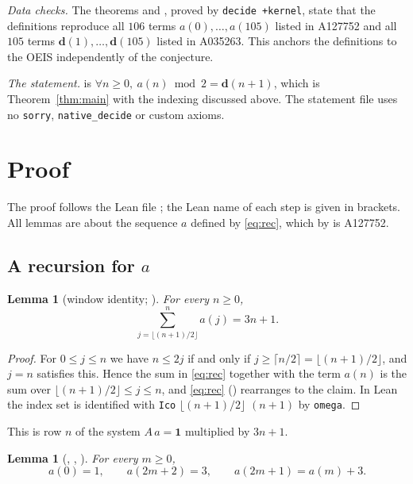 \documentclass[11pt]{amsart}
\theoremstyle{plain}
\newtheorem{lemma}[theorem]{Lemma}
\theoremstyle{definition}
\newcommand{\pd}{\mathbf{d}}
\begin{document}
\emph{Data checks.} The theorems  and , proved by \texttt{decide +kernel}, state that the definitions reproduce all $106$ terms $a(0),\dots,a(105)$ listed in A127752 and all $105$ terms $\pd(1),\dots,\pd(105)$ listed in A035263. This anchors the definitions to the OEIS independently of the conjecture.

\emph{The statement.}  is $\forall n\ge0,\ a(n)\bmod 2=\pd(n+1)$, which is Theorem~\ref{thm:main} with the indexing discussed above. The statement file uses no \texttt{sorry}, \texttt{native\_decide} or custom axioms.

\section{Proof}\label{sec:proof}

The proof follows the Lean file ; the Lean name of each step is given in brackets. All lemmas are about the sequence $a$ defined by \eqref{eq:rec}, which by  is A127752.

\subsection{A recursion for \texorpdfstring{$a$}{a}}

\begin{lemma}[window identity; ]\label{lem:window}
For every $n\ge0$,
\[
  \sum_{j=\lfloor(n+1)/2\rfloor}^{n}a(j)=3n+1 .
\]
\end{lemma}

\begin{proof}
For $0\le j\le n$ we have $n\le 2j$ if and only if $j\ge\lceil n/2\rceil=\lfloor(n+1)/2\rfloor$, and $j=n$ satisfies this. Hence the sum in \eqref{eq:rec} together with the term $a(n)$ is the sum over $\lfloor(n+1)/2\rfloor\le j\le n$, and \eqref{eq:rec} () rearranges to the claim. In Lean the index set is identified with \texttt{Ico} $\lfloor(n+1)/2\rfloor$ $(n+1)$ by \texttt{omega}.
\end{proof}

This is row $n$ of the system $A\,a=\mathbf1$ multiplied by $3n+1$.

\begin{lemma}[, , ]\label{lem:arec}
For every $m\ge0$,
\[
  a(0)=1,\qquad a(2m+2)=3,\qquad a(2m+1)=a(m)+3 .
\]
\end{lemma}
\end{document}
